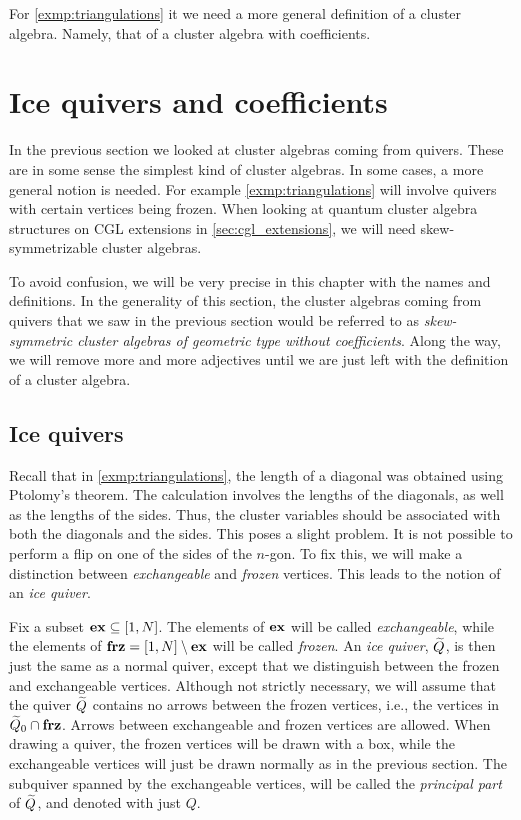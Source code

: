 For \cref{exmp:triangulations} it we need a more general definition of a cluster
algebra. Namely, that of a cluster algebra with coefficients.

\section{Ice quivers and coefficients}\label{sec:ice_quivers_and_coefficients}

In the previous section we looked at cluster algebras coming from quivers. These are in
some sense the simplest kind of cluster algebras. In some cases, a more general notion
is needed. For example \cref{exmp:triangulations} will involve quivers with certain
vertices being frozen. When looking at quantum cluster algebra structures on CGL
extensions in \cref{sec:cgl_extensions}, we will need skew-symmetrizable cluster
algebras.

To avoid confusion, we will be very precise in this chapter with the names and
definitions. In the generality of this section, the cluster algebras coming from
quivers that we saw in the previous section would be referred to as
\emph{skew-symmetric cluster algebras of geometric type without coefficients}. Along
the way, we will remove more and more adjectives until we are just left with the
definition of a cluster algebra.

\subsection{Ice quivers}

Recall that in \cref{exmp:triangulations}, the length of a diagonal was obtained using
Ptolomy's theorem. The calculation involves the lengths of the diagonals, as well as
the lengths of the sides. Thus, the cluster variables should be associated with both
the diagonals and the sides. This poses a slight problem. It is not possible to perform
a flip on one of the sides of the $n$-gon. To fix this, we will make a distinction
between \emph{exchangeable} and \emph{frozen} vertices. This leads to the notion of an
\emph{ice quiver}.

Fix a subset $\mathbf{ex} \subseteq [1, N]$. The elements of $\mathbf{ex}$ will be called
\emph{exchangeable}, while the elements of $\mathbf{frz} = [1, N] \setminus
	\mathbf{ex}$ will be called \emph{frozen}. An \emph{ice quiver}, $\widetilde{Q}$, is then
just the same as a normal quiver, except that we distinguish between the frozen and
exchangeable vertices. Although not strictly necessary, we will assume that the quiver
$\widetilde{Q}$ contains no arrows between the frozen vertices, i.e., the vertices in $\widetilde{Q}_0 \cap
	\mathbf{frz}$. Arrows between exchangeable and frozen vertices are allowed. When drawing a
quiver, the frozen vertices will be drawn with a box, while the exchangeable vertices
will just be drawn normally as in the previous section. The subquiver spanned by the
exchangeable vertices, will be called the \emph{principal part} of $\widetilde{Q}$, and denoted with just $Q$.

